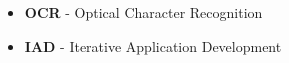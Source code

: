 

\begin{itemize}
	\item{\textbf{OCR} - Optical Character Recognition}
	\item{\textbf{IAD} - Iterative Application Development}
\end{itemize}






